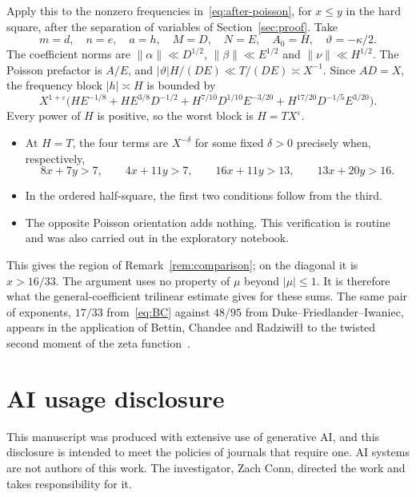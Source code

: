 \documentclass[11pt]{amsart}
\theoremstyle{definition}
\theoremstyle{remark}
\numberwithin{equation}{section}
\newcommand{\eps}{\varepsilon}
\begin{document}
Apply this to the nonzero frequencies in~\eqref{eq:after-poisson}, for
$x\le y$ in the hard square, after the separation of variables of
Section~\ref{sec:proof}.  Take
\[
 m=d,\quad n=e,\quad a=h,\quad M=D,\quad N=E,\quad A_0=H,\quad
 \vartheta=-\kappa/2 .
\]
The coefficient norms are $\|\alpha\|\ll D^{1/2}$, $\|\beta\|\ll E^{1/2}$ and
$\|\nu\|\ll H^{1/2}$.  The Poisson prefactor is $A/E$, and
$|\vartheta|H/(DE)\ll T/(DE)\asymp X^{-1}$.  Since $AD=X$, the frequency
block $|h|\asymp H$ is bounded by
\[
 X^{1+\eps}\bigl(HE^{-1/8}+HE^{3/8}D^{-1/2}
 +H^{7/10}D^{1/10}E^{-3/20}+H^{17/20}D^{-1/5}E^{3/20}\bigr).
\]
Every power of $H$ is positive, so the worst block is $H=TX^{\eps}$.
\begin{itemize}
\item At $H=T$, the four terms are $X^{-\delta}$ for some fixed $\delta>0$
precisely when, respectively,
\[
 8x+7y>7,\qquad 4x+11y>7,\qquad 16x+11y>13,\qquad 13x+20y>16 .
\]
\item In the ordered half-square, the first two conditions follow from the
third.
\item The opposite Poisson orientation adds nothing.  This verification is
routine and was also carried out in the exploratory notebook.
\end{itemize}
This gives the region of Remark~\ref{rem:comparison}; on the diagonal it is
$x>16/33$.  The argument uses no property of $\mu$ beyond $|\mu|\le1$.  It
is therefore what the general-coefficient trilinear estimate gives for
these sums.  The same pair of exponents, $17/33$ from~\eqref{eq:BC} against
$48/95$ from Duke--Friedlander--Iwaniec, appears in the application of
Bettin, Chandee and Radziwi\l\l{} to the twisted second moment of the zeta
function~\cite{BCR}.

\section*{AI usage disclosure}

This manuscript was produced with extensive use of generative AI, and this
disclosure is intended to meet the policies of journals that require one.
AI systems are not authors of this work.  The investigator, Zach Conn,
directed the work and takes responsibility for it.
\end{document}
